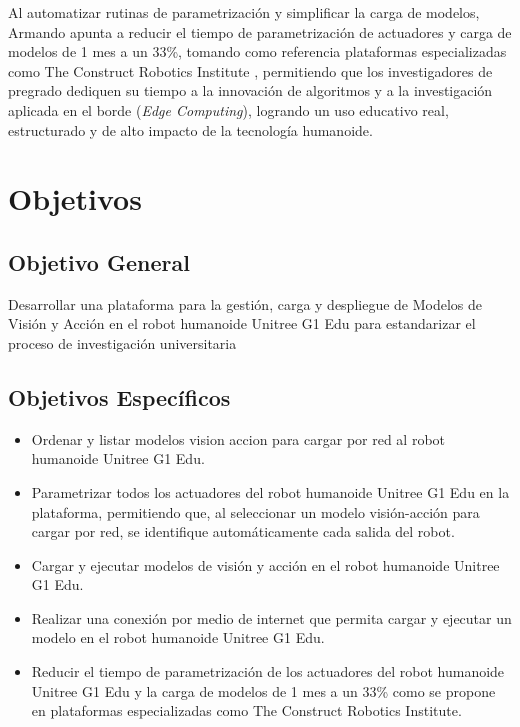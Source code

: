 \documentclass[stu,12pt,floatsintext]{apa7}
\begin{document}
Al automatizar rutinas de parametrización y simplificar la carga de modelos, Armando apunta a reducir el tiempo de parametrización de actuadores y carga de modelos de 1 mes a un 33\%, tomando como referencia plataformas especializadas como The Construct Robotics Institute \parencite{theconstruct2026humanoid}, permitiendo que los investigadores de pregrado dediquen su tiempo a la innovación de algoritmos y a la investigación aplicada en el borde (\textit{Edge Computing}), logrando un uso educativo real, estructurado y de alto impacto de la tecnología humanoide.

\clearpage


\section{Objetivos}



\subsection{Objetivo General}

Desarrollar una plataforma para la gestión, carga y despliegue de Modelos de Visión y Acción en
el robot humanoide Unitree G1 Edu para estandarizar el proceso de investigación universitaria

\subsection{Objetivos Específicos}
\begin{itemize}
    \item Ordenar y listar modelos vision accion para cargar por red al robot humanoide Unitree G1 Edu.
    \item Parametrizar todos los actuadores del robot humanoide Unitree G1 Edu en la plataforma, permitiendo que, al seleccionar un modelo visión-acción para cargar por red, se identifique automáticamente cada salida del robot.
    \item Cargar y ejecutar modelos de visión y acción en el robot humanoide Unitree G1 Edu.
    \item Realizar una conexión por medio de internet que permita cargar y ejecutar un modelo en el robot humanoide Unitree G1 Edu.
    \item Reducir el tiempo de parametrización de los actuadores del robot humanoide Unitree G1 Edu y la carga de modelos de 1 mes a un 33\% como se propone en plataformas especializadas como The Construct Robotics Institute.
\end{itemize}
\end{document}
